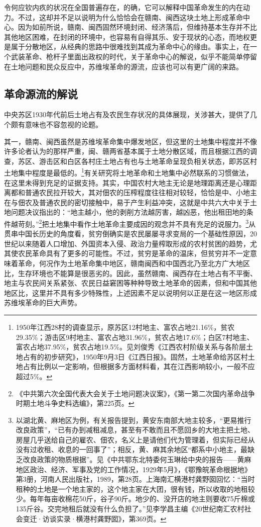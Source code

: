 令何应钦内疚的状况在全国普遍存在，的确，它可以解释中国革命发生的内在动力。不过，这却并不足以说明为什么恰恰会在赣南、闽西这块土地上形成革命中心。因为如前所说，赣南、闽西固然环境封闭、经济落后，但维持基本生存并不比其他地区困难，在封闭的环境中，也容易有自得其乐、安于现状的心态，而地权更是属于分散地区，从经典的思路中很难找到其成为革命中心的缘由。事实上，在一个武装革命、枪杆子里面出政权的时代，关于革命中心的解说，似乎不能简单停留在土地问题和民众反应中，苏维埃革命的源流，应该也可以有更广阔的来路。

\subsection{革命源流的解说}


中央苏区1930年代前后土地占有及农民生存状况的具体展现，关涉甚大，提供了几个颇有意味也不容忽视的论题。


其一，赣南、闽西虽然是苏维埃革命集中爆发地区，但这里的土地集中程度并不像许多论者认为的那样严重，闽、赣两省基本属于土地分散区域，而且根据江西的调查，苏区、游击区和白区各村庄土地占有也与土地革命呈现负相关状态，即苏区村土地集中程度是最低的。\footnote{1950年江西28村的调查显示，原苏区12村地主、富农占地21.16\%，贫农29.35\%；游击区9村地主、富农占地31.96\%，贫农占地17.6\%；白区7村地主、富农占地37.95\%，贫农占地19.5\%。见刘俊秀《江西农村阶级关系与各阶层土地占有的初步研究》，1950年9月3日《江西日报》。固然，土地革命给苏区村土地占有比例以一定影响，但根据多方面材料看，其在江西影响较小，一般不应超过5\%。}有关研究将土地革命和土地集中必然联系的习惯做法，在这里未得到充足的证据支持。其实，中国农村大地主无论是地理距离还是心理距离都和普通农民拉开较大，其对佃农的压榨程度往往相对较轻，恰恰是中、小地主在与佃农及普通农民的密切接触中，易于产生利益冲突，这就是中共六大中关于土地问题决议指出的：“地主越小，他的剥削方法越厉害，越凶恶，他出租田地的条件越苛刻。”\footnote{《中共第六次全国代表大会关于土地问题决议案》，《第一第二次国内革命战争时期土地斗争史料选编》，第225页。}把土地集中看作土地革命主要成因的观念并不具有充足的说服力。\footnote{以湖北黄、麻地区为例，有关报告提到，黄安东南部大地主较多，“更易推行改良政策”，“已有办到减租减息，甚至有不敢而且不愿回乡的大地主把土地、房屋几乎送给自己的雇农、佃农，名义上是请他们代为管理着，但实际已经从没有过收租、收息的一回事了”；相反，黄、麻其余地区“都系中小地主，最缺乏改良政策的物质根据”。见《中共鄂东北特委何玉琳给中央的报告——黄麻地区政治、经济、军事及党的工作情况，1929年5月》，《鄂豫皖革命根据地》第3册，河南人民出版社，1989，第28页。上海南汇横港村龚野囡回忆：“当时租种的土地是一个地主家的，这个地主家在大团，很有钱，所以收取的地租较少。每年每亩收棉花50斤，谷子90斤。地少的、没开店的地主则要收75斤棉或135斤谷。交完地租后就没有什么负担了。”见李学昌主编《20世纪南汇农村社会变迁·访谈实录·横港村龚野囡》，第369页。}从贯串中国长历史的角度看，贫穷倒确实是农民屡屡寻求变局的一个基础性原因，20世纪以来随着人口增加、外国资本入侵、政治力量榨取形成的农村贫困的趋势，尤其使农民革命具有了更多的可能性。不过，贫穷是革命的温床，但贫穷并不一定意味着革命，何况作为土地革命集中地区，赣南闽西和中国西北乃至北方广大地区比，生存环境也不能算是很恶劣的。因此，虽然赣南、闽西存在土地占有不平衡、地主与农民间关系紧张、农民日益窘困等种种导致土地革命的因素，但和中国其他地区比，这里并不具有多少特殊性，上述因素不足以说明何以正是在这一地区形成苏维埃革命的巨大声势。


